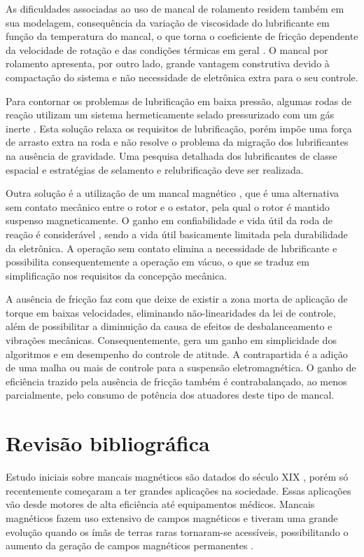 As dificuldades associadas ao uso de mancal de rolamento residem também em sua modelagem, consequência da variação de viscosidade do lubrificante em função da temperatura do mancal, o que torna o coeficiente de fricção dependente da velocidade de rotação e das condições térmicas em geral \citep{Carrara2007}. O mancal por rolamento apresenta, por outro lado, grande vantagem construtiva devido à compactação do sistema e não necessidade de eletrônica extra para o seu controle. 

Para contornar os problemas de lubrificação em baixa pressão, algumas rodas de reação  utilizam um sistema hermeticamente selado pressurizado com um gás inerte \citep{Krishnan2010}. Esta solução relaxa os requisitos de lubrificação, porém impõe uma força de arrasto extra na roda e não resolve o problema da migração dos lubrificantes na ausência de gravidade. Uma pesquisa detalhada dos lubrificantes de classe espacial e estratégias de selamento e relubrificação deve ser realizada.

Outra solução é a utilização de um mancal magnético \citep{Bangcheng2012}, que é uma alternativa sem contato mecânico entre o rotor e o estator, pela qual o rotor é mantido suspenso magneticamente. O ganho em confiabilidade e vida útil da roda de reação é considerável \citep{Marble2006}, sendo a vida útil basicamente limitada  pela durabilidade da eletrônica. A operação sem contato elimina a necessidade de lubrificante e possibilita consequentemente a operação em vácuo, o que se traduz em simplificação nos requisitos da concepção mecânica. 

A ausência de fricção faz com que deixe de existir a zona morta de aplicação de torque em baixas velocidades, eliminando não-linearidades da lei de controle, além de possibilitar a diminuição da causa de efeitos de desbalanceamento e vibrações mecânicas. Consequentemente, gera um ganho em simplicidade dos algoritmos e em desempenho do controle de atitude. A contrapartida é a adição de uma malha ou mais de controle para a suspensão eletromagnética. O ganho de eficiência trazido pela ausência de fricção também é contrabalançado, ao menos parcialmente, pelo consumo de potência dos atuadores deste tipo de mancal.


\section{Revisão bibliográfica}


Estudo iniciais sobre mancais magnéticos são datados do século XIX \citep{Weise1989}, porém só recentemente começaram a ter grandes aplicações na sociedade. Essas aplicações vão desde motores de alta eficiência até equipamentos médicos. Mancais magnéticos fazem uso extensivo de campos magnéticos e tiveram uma grande evolução quando os ímãs de terras raras tornaram-se acessíveis, possibilitando o aumento da geração de campos magnéticos permanentes \citep{Furlani2001}.

